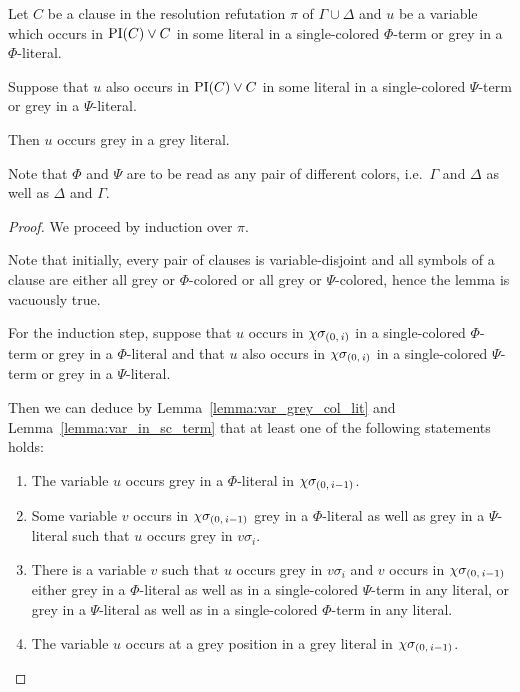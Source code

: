 \documentclass[,%
	draft=false,%
	numbers=noendperiod
	12pt,
	a4paper,
	oneside,%
	openany,
]{memoir}
\begin{document}
\begin{lemma}
	Let $C$ be a clause in the resolution refutation $\pi$ of $\Gamma \cup \Delta$
	and $u$ be a variable which occurs in $\operatorname{PI}(C)\lor C$ in some literal in a single-colored $\Phi$-term or grey in a $\Phi$-literal.

	Suppose that $u$ also occurs in $\operatorname{PI}(C) \lor C$ in some literal in a single-colored $\Psi$-term or grey in a $\Psi$-literal.

	Then $u$ occurs grey in a grey literal.

\end{lemma}
Note that $\Phi$ and $\Psi$ are to be read as any pair of different colors, i.e.\ $\Gamma$ and $\Delta$ as well as $\Delta$ and $\Gamma$.
\begin{proof}
	We proceed by induction over $\pi$. 

	Note that initially, every pair of clauses is variable-disjoint and all symbols of a clause are either all grey or $\Phi$-colored or all grey or $\Psi$-colored, hence the lemma is vacuously true.

	For the induction step,
	suppose that $u$ occurs in $\chi\sigma_{(0,\,i)}$ in a single-colored $\Phi$-term or grey in a $\Phi$-literal and 
	that $u$ also occurs in $\chi\sigma_{(0,\,i)}$ in a single-colored $\Psi$-term or grey in a $\Psi$-literal.

	Then we can deduce by Lemma~\ref{lemma:var_grey_col_lit} and Lemma~\ref{lemma:var_in_sc_term} that at least one of the following statements holds:
	\begin{enumerate}
		\item
			\label{oozoh7Oh1}
			The variable $u$ occurs grey in a $\Phi$-literal in $\chi\sigma_{(0,\,i-1)}$.

		\item 
			\label{oozoh7Oh2}
			Some variable $v$ occurs in $\chi\sigma_{(0,\,i-1)}$ grey in a $\Phi$-literal as well as grey in a $\Psi$-literal such that $u$ occurs grey in $v\sigma_i$.

		\item 
			\label{oozoh7Oh3}
			There is a variable $v$ such that $u$ occurs grey in $v\sigma_i$ and $v$ occurs in $\chi\sigma_{(0,\,i-1)}$
			either grey in a $\Phi$-literal as well as in a single-colored $\Psi$-term in any literal, 
			or grey in a $\Psi$-literal as well as in a single-colored $\Phi$-term in any literal.

		\item
			\label{oozoh7Oh4}
			The variable $u$ occurs at a grey position in a grey literal in $\chi\sigma_{(0,\,i-1)}$.


\end{enumerate}
\end{proof}
\end{document}
